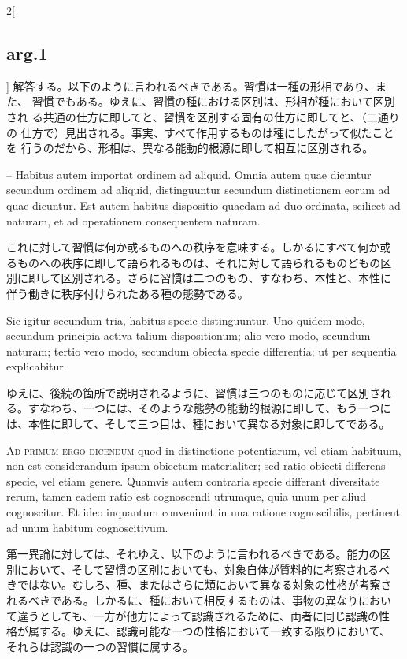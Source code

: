 \documentclass[paper=a4paper,fontsize=10pt,jafontsize=9pt,titlepage]{jlreq}
\begin{document}
\begin{paracol}{2}[\subsection{arg.1}]
解答する。以下のように言われるべきである。習慣は一種の形相であり、また、
習慣でもある。ゆえに、習慣の種における区別は、形相が種において区別され
る共通の仕方に即してと、習慣を区別する固有の仕方に即してと、（二通りの
仕方で）見出される。事実、すべて作用するものは種にしたがって似たことを
行うのだから、形相は、異なる能動的根源に即して相互に区別される。

\switchcolumn*

-- Habitus autem importat ordinem ad aliquid. Omnia autem quae
   dicuntur secundum ordinem ad aliquid, distinguuntur secundum
   distinctionem eorum ad quae dicuntur. Est autem habitus dispositio
   quaedam ad duo ordinata, scilicet ad naturam, et ad operationem
   consequentem naturam.

\switchcolumn

これに対して習慣は何か或るものへの秩序を意味する。しかるにすべて何か或
るものへの秩序に即して語られるものは、それに対して語られるものどもの区
別に即して区別される。さらに習慣は二つのもの、すなわち、本性と、本性に
伴う働きに秩序付けられたある種の態勢である。

\switchcolumn*

Sic igitur secundum tria, habitus specie distinguuntur. Uno quidem
modo, secundum principia activa talium dispositionum; alio vero modo,
secundum naturam; tertio vero modo, secundum obiecta specie
differentia; ut per sequentia explicabitur.

\switchcolumn

ゆえに、後続の箇所で説明されるように、習慣は三つのものに応じて区別され
る。すなわち、一つには、そのような態勢の能動的根源に即して、もう一つに
は、本性に即して、そして三つ目は、種において異なる対象に即してである。

\switchcolumn*[\subsection{ad.1}]

{\scshape Ad primum ergo dicendum} quod in distinctione potentiarum,
vel etiam habituum, non est considerandum ipsum obiectum materialiter;
sed ratio obiecti differens specie, vel etiam genere. Quamvis autem
contraria specie differant diversitate rerum, tamen eadem ratio est
cognoscendi utrumque, quia unum per aliud cognoscitur. Et ideo
inquantum conveniunt in una ratione cognoscibilis, pertinent ad unum
habitum cognoscitivum.

\switchcolumn

第一異論に対しては、それゆえ、以下のように言われるべきである。能力の区
別において、そして習慣の区別においても、対象自体が質料的に考察されるべ
きではない。むしろ、種、またはさらに類において異なる対象の性格が考察さ
れるべきである。しかるに、種において相反するものは、事物の異なりにおい
て違うとしても、一方が他方によって認識されるために、両者に同じ認識の性
格が属する。ゆえに、認識可能な一つの性格において一致する限りにおいて、
それらは認識の一つの習慣に属する。


\end{paracol}
\end{document}
